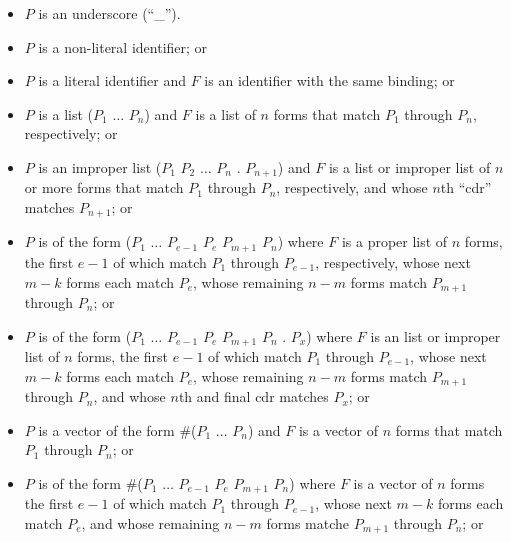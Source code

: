 \begin{entry}
\begin{itemize}
\item $P$ is an underscore (``{\cf \_}'').

\item $P$ is a non-literal identifier; or

\item $P$ is a literal identifier and $F$ is an identifier with the same
      binding; or

\item $P$ is a list {\cf ($P_1$ $\dots$ $P_n$)} and $F$ is a
      list of $n$
      forms that match $P_1$ through $P_n$, respectively; or

\item $P$ is an improper list
      {\cf ($P_1$ $P_2$ $\dots$ $P_n$ . $P_{n+1}$)}
      and $F$ is a list or
      improper list of $n$ or more forms that match $P_1$ through $P_n$,
      respectively, and whose $n$th ``cdr'' matches $P_{n+1}$; or

\item $P$ is of the form
      {\cf ($P_1$ $\dots$ $P_{e-1}$ $P_{e}$  $P_{m+1}$ \dotsfoo{} $P_n$)}
      where $F$ is
      a proper list of $n$ forms, the first $e-1$ of which match
      $P_1$ through $P_{e-1}$, respectively,
      whose next $m-k$ forms each match $P_e$,
      whose remaining $n-m$ forms match $P_{m+1}$ through $P_n$; or

\item $P$ is of the form
      {\cf ($P_1$ $\dots$ $P_{e-1}$ $P_{e}$  $P_{m+1}$ \dotsfoo{} $P_n$ . $P_x$)}
      where $F$ is
      an list or improper list of $n$ forms, the first $e-1$ of which match
      $P_1$ through $P_{e-1}$,
      whose next $m-k$ forms each match $P_e$,
      whose remaining $n-m$ forms match $P_{m+1}$ through $P_n$,
      and whose $n$th and final cdr matches $P_x$; or

\item $P$ is a vector of the form {\cf \#($P_1$ $\dots$ $P_n$)}
      and $F$ is a vector
      of $n$ forms that match $P_1$ through $P_n$; or

\item $P$ is of the form
      {\cf \#($P_1$ $\dots$ $P_{e-1}$ $P_{e}$  $P_{m+1}$ \dotsfoo $P_n$)}
      where $F$ is a vector of $n$
      forms the first $e-1$ of which match $P_1$ through $P_{e-1}$,
      whose next $m-k$ forms each match $P_e$,
      and whose remaining $n-m$ forms matche $P_{m+1}$ through $P_n$; or


\end{itemize}
\end{entry}
